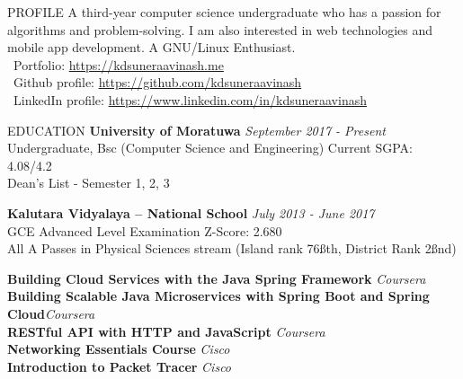 \documentclass{cv}
\subtitle{344/1, Moonamalgahawatta, Duwa Temple Road, Kalutara South.}  %
\subtitle{(076) 833 6850 \\ \href{mailto:suneraavinash.17@cse.mrt.ac.lk}{suneraavinash.17@cse.mrt.ac.lk}}
\subtitle{\url{https://kdsuneraavinash.me}}
\begin{document}

\begin{rSection}{PROFILE}
    A third-year computer science undergraduate who has a passion for algorithms and problem-solving.
    I am also interested in web technologies and mobile app development.
    A GNU/Linux Enthusiast. \\
    \faGlobe\ Portfolio: \url{https://kdsuneraavinash.me} \\
    \faGithub\ Github profile: \url{https://github.com/kdsuneraavinash} \\
    \faLinkedin\ LinkedIn profile: \url{https://www.linkedin.com/in/kdsuneraavinash}
\end{rSection}

\begin{rSection}{EDUCATION}
    {\bf University of Moratuwa}                                \hfill {\em September 2017 - Present}
    \\ Undergraduate, Bsc (Computer Science and Engineering)    \hfill { Current SGPA: 4.08/4.2 }
    \\ Dean's List - Semester 1, 2, 3 \par

    {\bf Kalutara Vidyalaya – National School}                  \hfill {\em July 2013 - June 2017}
    \\ GCE Advanced Level Examination                           \hfill { Z-Score: 2.680 }
    \\ All A Passes in Physical Sciences stream (Island rank 76\ss{th}, District Rank 2\ss{nd}) \par

    {\bf Building Cloud Services with the Java Spring Framework}                \hfill {\em Coursera} \\
    {\bf Building Scalable Java Microservices with Spring Boot and Spring Cloud}\hfill {\em Coursera} \\
    {\bf RESTful API with HTTP and JavaScript}                                  \hfill {\em Coursera} \\
    {\bf Networking Essentials Course}                                                 \hfill {\em Cisco} \\
    {\bf Introduction to Packet Tracer}                                         \hfill {\em Cisco}
\end{rSection}
\end{document}

